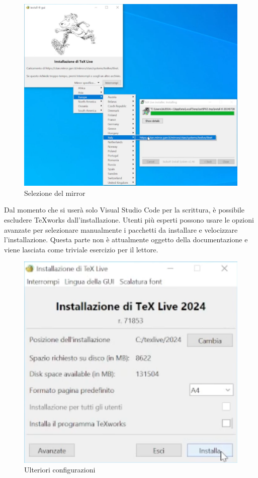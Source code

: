 \documentclass[envcountsame,envcountchap]{svmono}
\begin{document}
\begin{figure}[H]
    \centering
    \includegraphics[width=0.95\linewidth]{images/texlive/win/6_mirror_select.png}
    \caption{Selezione del mirror}
    \label{texlive_mirror}
\end{figure}
Dal momento che si userà solo Visual Studio Code per la scrittura, è possibile escludere TeXworks dall'installazione.
Utenti più esperti possono usare le opzioni avanzate per selezionare manualmente i pacchetti da installare
e velocizzare l'installazione. Questa parte non è attualmente oggetto della documentazione e viene lasciata
come triviale esercizio per il lettore.
\begin{figure}[H]
    \centering
    \includegraphics[width=0.8\linewidth]{images/texlive/win/7_configurator.png}
    \caption{Ulteriori configurazioni}
    \label{texlive_config_2}
\end{figure}
\end{document}
